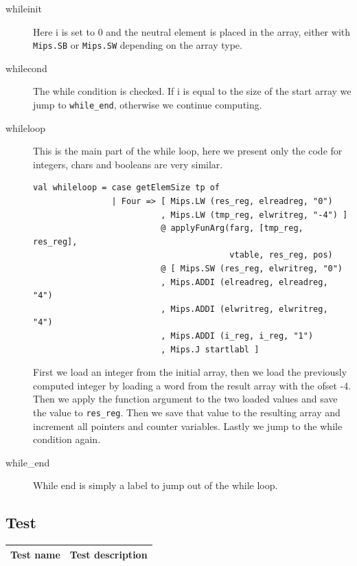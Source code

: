 \documentclass[11pt]{article}
\begin{document}
\begin{description}
        \item [whileinit] Here i is set to 0 and the neutral element is placed
            in the array, either with \texttt{Mips.SB} or \texttt{Mips.SW}
            depending on the array type.

        \item [whilecond] The while condition is checked.  If i is equal to the
            size of the start array we jump to \texttt{while\_end}, otherwise
            we continue computing.

        \item [whileloop] This is the main part of the while loop, here we
            present only the code for integers, chars and booleans are very
            similar.

            \begin{lstlisting}[basicstyle=\small]
val whileloop = case getElemSize tp of
                | Four => [ Mips.LW (res_reg, elreadreg, "0")
                          , Mips.LW (tmp_reg, elwritreg, "-4") ]
                          @ applyFunArg(farg, [tmp_reg, res_reg],
                                        vtable, res_reg, pos)
                          @ [ Mips.SW (res_reg, elwritreg, "0")
                          , Mips.ADDI (elreadreg, elreadreg, "4")
                          , Mips.ADDI (elwritreg, elwritreg, "4")
                          , Mips.ADDI (i_reg, i_reg, "1")
                          , Mips.J startlabl ]
            \end{lstlisting}

            First we load an integer from the initial array, then we load the
            previously computed integer by loading a word from the result array
            with the ofset -4.  Then we apply the function argument to the two
            loaded values and save the value to \texttt{res\_reg}.  Then we save
            that value to the resulting array and increment all pointers and
            counter variables.  Lastly we jump to the while condition again.

        \item [while\_end] While end is simply a label to jump out of the while
            loop.
    \end{description}

    \subsection{Test}
    \begin{tabular}{|l|l|}
        \hline
        \textbf{Test name} & \textbf{Test description}                        \\
        \hline

    \end{tabular}
\end{document}
